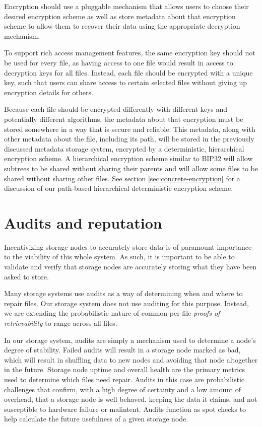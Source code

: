 \documentclass[11pt,fleqn,openany]{book}
\begin{document}
Encryption should use a pluggable mechanism that allows users to choose their
desired encryption scheme as well as store metadata about that encryption
scheme to allow them to recover their data using the appropriate decryption
mechanism.

To support rich access management features, the same encryption key should not
be used for every file, as having access to one file would result in access
to decryption keys for all files. Instead, each file should be encrypted with
a unique key, such that users can share access to certain selected files
without giving up encryption details for others.

Because each file should be encrypted differently with different keys and
potentially different algorithms, the metadata about that encryption must
be stored somewhere in a way that is secure and reliable. This metadata,
along with other metadata about the file, including its path, will
be stored in the previously discussed metadata storage system, encrypted
by a deterministic, hierarchical encryption scheme.
A hierarchical encryption scheme similar to
BIP32 \cite{bip32} will allow subtrees to be shared without sharing their
parents and will allow some files to be shared without sharing other files.
See section \ref{sec:concrete-encryption} for a discussion of our path-based
hierarchical deterministic encryption scheme.

\section{Audits and reputation}\label{sec:framework-audits}

Incentivizing storage nodes to accurately store data is of paramount importance
to
the viability of this whole system. As such, it is important to be able to
validate and verify that storage nodes are accurately storing what they have
been
asked to store.

Many storage systems use audits as a way of determining when and where to repair
files. Our storage system does not use auditing for this purpose.
Instead, we are extending the probabilistic nature of
common per-file {\em proofs of retrievability} \cite{proof-of-retrievability}
to range across all files.

In our storage system,
audits are simply a mechanism used to determine a node's degree of stability.
Failed audits will result in a storage node marked as bad, which
will result in shuffling data to new nodes and avoiding that node altogether
in the future. Storage node uptime and overall health are the primary metrics
used to determine which files need repair.
Audits in this case are probabilistic challenges that confirm, with a high
degree of certainty and a low amount of overhead, that a storage node is well
behaved, keeping the data it claims, and not susceptible to hardware
failure or malintent. Audits function as spot checks to help calculate
the future usefulness of a given storage node.
\end{document}
